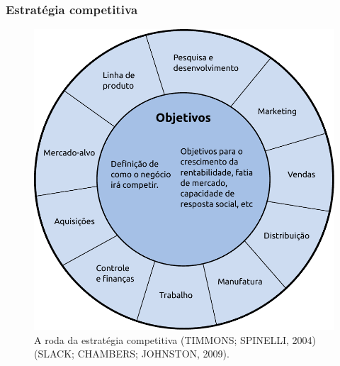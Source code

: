 \begin{frame}
    \frametitle{Estratégia competitiva}


\begin{figure}[!h]
	\begin{center}
		\includegraphics[scale=0.5]{imagens/estrategia.pdf}
	\end{center}
	\caption{A roda da estratégia competitiva (TIMMONS; SPINELLI, 2004) (SLACK; CHAMBERS; JOHNSTON, 2009).}			
\end{figure}

\end{frame}

